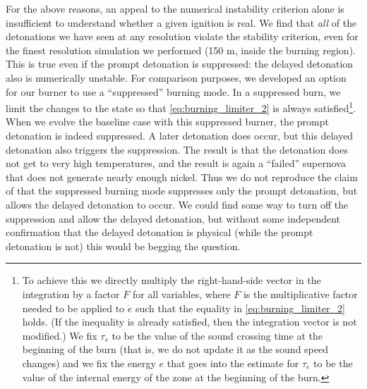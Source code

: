 \documentclass[twocolumn,numberedappendix]{../aastex6}
\begin{document}
For the above reasons, an appeal to the numerical instability criterion alone is
insufficient to understand whether a given ignition is real. We find that \textit{all}
of the detonations we have seen at any resolution violate the stability criterion,
even for the finest resolution simulation we performed (150 m, inside the burning region).
This is true even if the prompt detonation is suppressed:
the delayed detonation also is numerically unstable. For comparison purposes, we
developed an option for our burner to use a ``suppressed'' burning mode. In a
suppressed burn, we limit the changes to the state so that \autoref{eq:burning_limiter_2}
is always satisfied\footnote{To achieve this we directly multiply the
right-hand-side vector in the integration by a factor $F$
for all variables, where $F$ is the multiplicative factor needed to
be applied to $\dot{e}$ such that the equality in \autoref{eq:burning_limiter_2}
holds. (If the inequality is already satisfied, then the integration
vector is not modified.) We fix $\tau_s$ to be the value of the sound
crossing time at the beginning of the burn (that is, we do not
update it as the sound speed changes) and we fix the energy $e$
that goes into the estimate for $\tau_e$ to be the value of the
internal energy of the zone at the beginning of the burn.}. When we
evolve the baseline case with this suppressed burner, the prompt detonation
is indeed suppressed. A later detonation does occur, but this delayed
detonation also triggers the suppression. The result is that the detonation
does not get to very high temperatures, and the result is again a ``failed''
supernova that does not generate nearly enough nickel. Thus we do not
reproduce the claim of \citeauthor{kushnir:2013} that the suppressed
burning mode suppresses only the prompt detonation, but allows the
delayed detonation to occur. We could find some way to turn off the
suppression and allow the delayed detonation, but without some independent
confirmation that the delayed detonation is physical (while the prompt
detonation is not) this would be begging the question.
\end{document}
